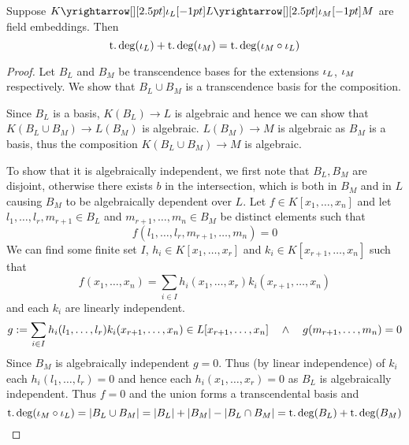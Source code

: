 \begin{prop}
    Suppose $K \map{\io_L}{} L \map{\io_M}{} M$ are field embeddings. 
    Then 
    \[\operatorname{t.deg}(\iota_L) + \operatorname{t.deg}(\iota_M) = \operatorname{t.deg}(\iota_M \circ \iota_L)\]
\end{prop}
\begin{proof}
    Let $B_L$ and $B_M$ be transcendence bases for the extensions $\iota_L$,
    $\iota_M$ respectively.
    We show that $B_L \cup B_M$ is a transcendence basis for the composition.

    Since $B_L$ is a basis, 
    $K(B_L) \to L$ is algebraic and hence we can show that 
    $K(B_L \cup B_M) \to L(B_M)$ is algebraic.
    $L(B_M) \to M$ is algebraic as $B_M$ is a basis,
    thus the composition $K(B_L \cup B_M) \to M$ is algebraic.

    To show that it is algebraically independent,
    we first note that $B_L,B_M$ are disjoint,
    otherwise there exists $b$ in the intersection, 
    which is both in $B_M$ and in $L$ causing
    $B_M$ to be algebraically dependent over $L$.
    Let $f \in K[x_1, \dots, x_n]$ 
    and let $l_1,\dots,l_r,m_{r+1} \in B_L$
    and $m_{r+1}, \dots, m_n \in B_M$ be distinct elements such that
    \[f(l_1,\dots,l_r,m_{r+1}, \dots, m_n) = 0\]
    We can find some finite set $I$, $h_i \in K[x_1, \dots, x_r]$ and
    $k_i \in K[x_{r+1}, \dots, x_n]$ such that 
    \[f(x_1,\dots,x_n) = 
    \sum_{i \in I} h_i(x_1, \dots, x_r) k_i(x_{r+1}, \dots, x_{n})\]
    and each $k_i$ are linearly independent.
    \[g := \sum_{i \in I} h_i(l_1, \dots, l_r) k_i(x_{r+1}, \dots, x_{n}) \in 
    L[x_{r+1}, \dots, x_n] \quad \land \quad g(m_{r+1}, \dots, m_n) = 0\]
    Since $B_M$ is algebraically independent $g = 0$.
    Thus (by linear independence) of $k_i$ each 
    $h_i(l_1, \dots, l_r) = 0$ and hence each 
    $h_i(x_1, \dots, x_r) = 0$ as $B_L$ is algebraically independent.
    Thus $f = 0$ and the union forms a transcendental basis and
    \[\operatorname{t.deg}(\iota_M\circ\iota_L) = \left\vert B_L \cup B_M \right\vert 
    = \left\vert B_L \right\vert + \left\vert B_M \right\vert - \left\vert B_L \cap B_M \right\vert = \operatorname{t.deg}(B_L) + \operatorname{t.deg}(B_M)\]
\end{proof} 

